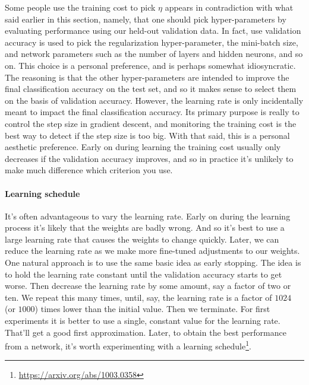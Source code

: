 \documentclass[12pt, letterpaper]{article}
\theoremstyle{definition}
\let\tb\textbf
\begin{document}
Some people use the training cost to pick $\eta$ appears in contradiction with what said earlier in this section, namely, that one should pick hyper-parameters by evaluating performance using our held-out validation data. In fact, use validation accuracy is used to pick the regularization hyper-parameter, the mini-batch size, and network parameters such as the number of layers and hidden neurons, and so on.  This choice is a personal preference, and is perhaps somewhat idiosyncratic. The reasoning is that the other hyper-parameters are intended to improve the final classification accuracy on the test set, and so it makes sense to select them on the basis of validation accuracy. However, the learning rate is only incidentally meant to impact the final classification accuracy. Its primary purpose is really to control the step size in gradient descent, and monitoring the training cost is the best way to detect if the step size is too big. With that said, this is a personal aesthetic preference. Early on during learning the training cost usually only decreases if the validation accuracy improves, and so in practice it's unlikely to make much difference which criterion you use.

\paragraph{\tb{Learning schedule}} It's often advantageous to vary the learning rate. Early on during the learning process it's likely that the weights are badly wrong. And so it's best to use a large learning rate that causes the weights to change quickly. Later, we can reduce the learning rate as we make more fine-tuned adjustments to our weights.  One natural approach is to use the same basic idea as early stopping. The idea is to hold the learning rate constant until the validation accuracy starts to get worse. Then decrease the learning rate by some amount, say a factor of two or ten. We repeat this many times, until, say, the learning rate is a factor of $1024$ (or $1000$) times lower than the initial value. Then we terminate.  For first experiments it is better to use a single, constant value for the learning rate. That'll get a good first approximation. Later, to obtain the best performance from a network, it's worth experimenting with a learning schedule\footnote{\url{https://arxiv.org/abs/1003.0358}}.
\end{document}
